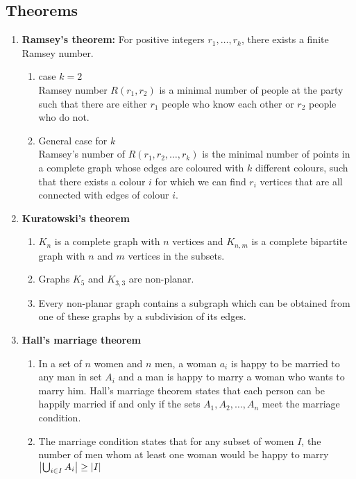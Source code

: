 \documentclass{article}
\begin{document}
\subsection*{Theorems}
	\begin{enumerate}
		\item \textbf{Ramsey's theorem: } For positive integers $r_1,\dots,r_k$, there exists a finite Ramsey number. 
		\begin{enumerate}
		 	\item case $k=2$ \\
		 	Ramsey number $R(r_1,r_2)$ is a minimal number of people at the party such that there are either $r_1$ people who know each other or $r_2$ people who do not.
		 	\item General case for $k$ \\
		 	Ramsey's number of $R(r_1,r_2,\dots,r_k)$ is the minimal number of points in a complete graph whose edges are coloured with $k$ different colours, such that there exists a colour $i$ for which we can find $r_i$ vertices that are all connected with edges of colour $i$.
		\end{enumerate}
		
		\item \textbf{Kuratowski's theorem} %
		\begin{enumerate}
			\item $K_n$ is a complete graph with $n$ vertices and $K_{n,m}$ is a complete bipartite graph with $n$ and $m$ vertices in the subsets.
			\item Graphs $K_5$ and $K_{3,3}$ are non-planar.
			\item Every non-planar graph contains a subgraph which can be obtained from one of these graphs by a subdivision of its edges.
		
		\end{enumerate}
		\item \textbf{Hall's marriage theorem} %
		\begin{enumerate}
			\item In a set of $n$ women and $n$ men, a woman $a_i$ is happy to be married to any man in set $A_i$ and a man is happy to marry a woman who wants to marry him. Hall's marriage theorem states that each person can be happily married if and only if the sets $A_1,A_2,\dots,A_n$ meet the marriage condition.
			\item The marriage condition states that for any subset of women $I$, the number of men whom at least one woman would be happy to marry $\abs{\bigcup_{i \in I}A_i} \geq \abs{I}$
		\end{enumerate}
	\end{enumerate}
\end{document}
